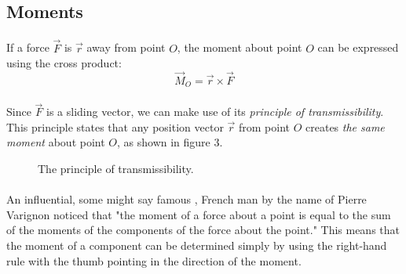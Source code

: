 \documentclass[12pt]{article}
\begin{document}
\subsection{Moments}
\paragraph{}
If a force $\vec{F}$ is $\vec{r}$ away from point $O$, the moment about point $O$ can be expressed using the cross product:
\begin{equation}
    \vec{M}_O = \vec{r} \times \vec{F}
\end{equation}

\paragraph{}
Since $\vec{F}$ is a sliding vector, we can make use of its \textit{principle of transmissibility}.
This principle states that any position vector $\vec{r}$ from point $O$ creates \textit{the same moment} about point $O$, as shown in figure 3.

\begin{figure}[h]
\centering
{}
\caption{The principle of transmissibility.}
\end{figure}

\paragraph{}
An influential, some might say famous \cite{buckham}, French man by the name of Pierre Varignon noticed that "the moment of a force about a point is equal to the sum of the moments of the components of the force about the point."
This means that the moment of a component can be determined simply by using the right-hand rule with the thumb pointing in the direction of the moment.
\end{document}
